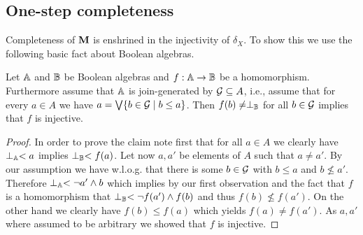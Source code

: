 \documentclass{book}
\begin{document}
\subsection{One-step completeness}

Completeness of $\mathbf{M}$ is enshrined in the injectivity of
$\delta_{X}$. To show this we use the following basic fact about
Boolean algebras.

\begin{lemma}\label{lem:bafact}
  Let $\mathbb{A}$ and $\mathbb{B}$ be Boolean algebras and $f:\mathbb{A} \to \mathbb{B}$ be a
  homomorphism. Furthermore assume that $\mathbb{A}$ is join-generated by
  $\mathcal{G} \subseteq A$, i.e., assume that for every $a \in A$ we have $a
  = \bigvee \{b \in \mathcal{G} \mid b \leq a\}$.  Then $f(b) \not=
  \perp_{\mathbb{B}}$ for all $b \in \mathcal{G}$ implies that $f$ is injective.
\end{lemma}
\xxviproofspace
\begin{proof}
  In order to prove the claim note first that for all $a \in A$ we
  clearly have $\perp_{\mathbb{A}} < a$ implies $\perp_{\mathbb{B}} < f(a)$.  Let now
  $a,a'$ be elements of $A$ such that $a \not= a'$.  By our assumption
  we have w.l.o.g. that there is some $b \in \mathcal{G}$ with $b\leq a$ and
  $b \not \leq a'$. Therefore $\perp_{\mathbb{A}} < \neg a' \wedge b$ which
  implies by our first observation and the fact that $f$ is a
  homomorphism that $\perp_{\mathbb{B}} < \neg f(a') \wedge f(b)$ and thus
  $f(b) \not\leq f(a')$. On the other hand we clearly have $f(b) \leq
  f(a)$ which yields $f(a) \not= f(a')$.  As $a,a'$ where assumed to
  be arbitrary we showed that $f$ is injective.
\end{proof}
\end{document}
